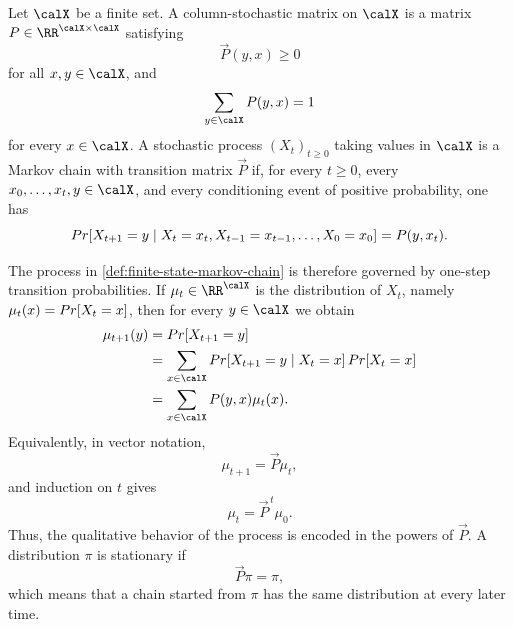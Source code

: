 \begin{definition}
	\label{def:finite-state-markov-chain}
	Let \(\calX\) be a finite set. A column-stochastic matrix on \(\calX\) is a matrix \(\vec{P}\in\RR^{\calX\times\calX}\) satisfying
	\begin{equation}
		\label{eq:transition-nonnegative}
		\vec{P}(y,x)\geq 0
	\end{equation}
	for all \(x,y\in\calX\), and
	\begin{equation}
		\label{eq:transition-column-sum}
		\sum_{y\in\calX}\vec{P}(y,x)=1
	\end{equation}
	for every \(x\in\calX\). A stochastic process \((X_t)_{t\geq 0}\) taking values in \(\calX\) is a Markov chain with transition matrix \(\vec{P}\) if, for every \(t\geq 0\), every \(x_0,\ldots,x_t,y\in\calX\), and every conditioning event of positive probability, one has
	\begin{equation}
		\label{eq:markov-property}
		\Prob[X_{t+1}=y\mid X_t=x_t,X_{t-1}=x_{t-1},\ldots,X_0=x_0]=\vec{P}(y,x_t).
	\end{equation}
\end{definition}

The process in \cref{def:finite-state-markov-chain} is therefore governed by one-step transition probabilities. If \(\mu_t\in\RR^{\calX}\) is the distribution of \(X_t\), namely \(\mu_t(x)=\Prob[X_t=x]\), then for every \(y\in\calX\) we obtain
\begin{align}
	\mu_{t+1}(y)
	 & =\Prob[X_{t+1}=y] \label{eq:markov-evolution-start}                                                   \\
	 & =\sum_{x\in\calX}\Prob[X_{t+1}=y\mid X_t=x]\Prob[X_t=x] \label{eq:markov-evolution-total-probability} \\
	 & =\sum_{x\in\calX}\vec{P}(y,x)\mu_t(x). \label{eq:markov-evolution-entrywise}
\end{align}
Equivalently, in vector notation,
\begin{equation}
	\label{eq:markov-evolution-vector}
	\mu_{t+1}=\vec{P}\mu_t,
\end{equation}
and induction on \(t\) gives
\begin{equation}
	\label{eq:markov-evolution-powers}
	\mu_t=\vec{P}^{\,t}\mu_0.
\end{equation}
Thus, the qualitative behavior of the process is encoded in the powers of \(\vec{P}\). A distribution \(\pi\) is stationary if
\begin{equation}
	\label{eq:stationary-distribution}
	\vec{P}\pi=\pi,
\end{equation}
which means that a chain started from \(\pi\) has the same distribution at every later time.

